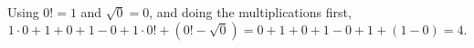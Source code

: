 Using $0!=1$ and $\sqrt0=0$, and doing the multiplications first,
\[1\cdot0+1+0+1-0+1\cdot0!+\left(0!-\sqrt0\right)=0+1+0+1-0+1+(1-0)=\boxed{4}.\]
